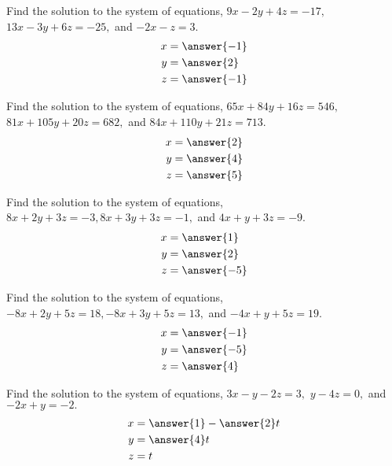\documentclass{ximera}
\begin{document}
\begin{problem}\label{prb:2.32} Find the solution to the system of equations, $9x-2y+4z=-17,
$ $13x-3y+6z=-25,$ and $-2x-z=3.$
 \begin{align*}
 x&=\answer{-1}\\
 y&=\answer{2}\\
 z&=\answer{-1}\\
 \end{align*}
\end{problem}

\begin{problem}\label{prb:2.33} Find the solution to the system of equations,
$65x+84y+16z=546,$ $81x+105y+20z=682,$ and $84x+110y+21z=713.$
 \begin{align*}
 x&=\answer{2}\\
 y&=\answer{4}\\
 z&=\answer{5}\\
 \end{align*}
\end{problem}

\begin{problem}\label{prb:2.34} Find the solution to the system of equations,
$8x+2y+3z=-3,8x+3y+3z=-1,$ and $4x+y+3z=-9.$
 \begin{align*}
 x&=\answer{1}\\
 y&=\answer{2}\\
 z&=\answer{-5}\\
 \end{align*}
\end{problem}

\begin{problem}\label{prb:2.35} Find the solution to the system of equations,
$-8x+2y+5z=18,-8x+3y+5z=13,$ and $-4x+y+5z=19.$
 \begin{align*}
 x&=\answer{-1}\\
 y&=\answer{-5}\\
 z&=\answer{4}\\
 \end{align*}
\end{problem}

\begin{problem}\label{prb:2.36} Find the solution to the system of equations, $3x-y-2z=3,$
$y-4z=0,$ and $-2x+y=-2.$
 \begin{align*}
 x&=\answer{1}-\answer{2}t\\
 y&=\answer{4}t\\
 z&=t\\
 \end{align*}
\end{problem}
\end{document}
